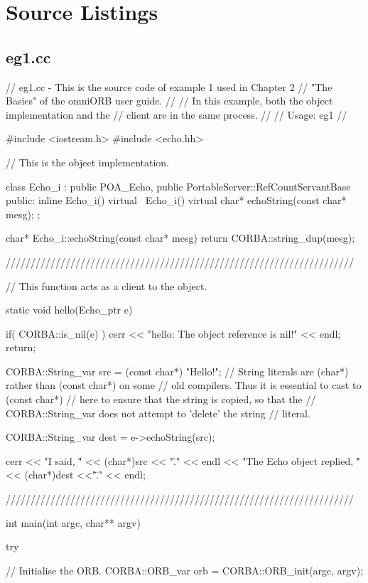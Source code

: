 \documentclass[11pt,twoside,a4paper]{book}
\begin{document}
\clearpage
\section{Source Listings}

\subsection{eg1.cc}

\begin{cxxlisting}
// eg1.cc - This is the source code of example 1 used in Chapter 2
//          "The Basics" of the omniORB user guide.
//
//          In this example, both the object implementation and the
//          client are in the same process.
//
// Usage: eg1
//

#include <iostream.h>
#include <echo.hh>


// This is the object implementation.

class Echo_i : public POA_Echo,
	       public PortableServer::RefCountServantBase
{
public:
  inline Echo_i() {}
  virtual ~Echo_i() {}
  virtual char* echoString(const char* mesg);
};


char* Echo_i::echoString(const char* mesg)
{
  return CORBA::string_dup(mesg);
}

//////////////////////////////////////////////////////////////////////

// This function acts as a client to the object.

static void hello(Echo_ptr e)
{
  if( CORBA::is_nil(e) ) {
    cerr << "hello: The object reference is nil!\n" << endl;
    return;
  }

  CORBA::String_var src = (const char*) "Hello!";
  // String literals are (char*) rather than (const char*) on some
  // old compilers.  Thus it is essential to cast to (const char*)
  // here to ensure that the string is copied, so that the
  // CORBA::String_var does not attempt to 'delete' the string
  // literal.

  CORBA::String_var dest = e->echoString(src);

  cerr << "I said, \"" << (char*)src << "\"." << endl
       << "The Echo object replied, \"" << (char*)dest <<"\"." << endl;
}

//////////////////////////////////////////////////////////////////////

int main(int argc, char** argv)
{


  try {
    // Initialise the ORB.
    CORBA::ORB_var orb = CORBA::ORB_init(argc, argv);

}}
\end{cxxlisting}
\end{document}
